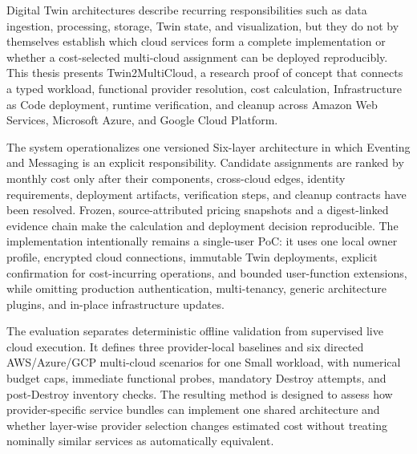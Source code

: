 Digital Twin architectures describe recurring responsibilities such as data
ingestion, processing, storage, Twin state, and visualization, but they do not
by themselves establish which cloud services form a complete implementation or
whether a cost-selected multi-cloud assignment can be deployed reproducibly.
This thesis presents Twin2MultiCloud, a research proof of concept that connects
a typed workload, functional provider resolution, cost calculation,
Infrastructure as Code deployment, runtime verification, and cleanup across
Amazon Web Services, Microsoft Azure, and Google Cloud Platform.

The system operationalizes one versioned Six-layer architecture in which
Eventing and Messaging is an explicit responsibility. Candidate assignments
are ranked by monthly cost only after their components, cross-cloud edges,
identity requirements, deployment artifacts, verification steps, and cleanup
contracts have been resolved. Frozen, source-attributed pricing snapshots and a
digest-linked evidence chain make the calculation and deployment decision
reproducible. The implementation intentionally remains a single-user PoC: it
uses one local owner profile, encrypted cloud connections, immutable Twin
deployments, explicit confirmation for cost-incurring operations, and bounded
user-function extensions, while omitting production authentication,
multi-tenancy, generic architecture plugins, and in-place infrastructure
updates.

The evaluation separates deterministic offline validation from supervised live
cloud execution. It defines three provider-local baselines and six directed
AWS/Azure/GCP multi-cloud scenarios for one Small workload, with numerical
budget caps, immediate functional probes, mandatory Destroy attempts, and
post-Destroy inventory checks. The resulting method is designed to assess how
provider-specific service bundles can implement one shared architecture and
whether layer-wise provider selection changes estimated cost without treating
nominally similar services as automatically equivalent.

